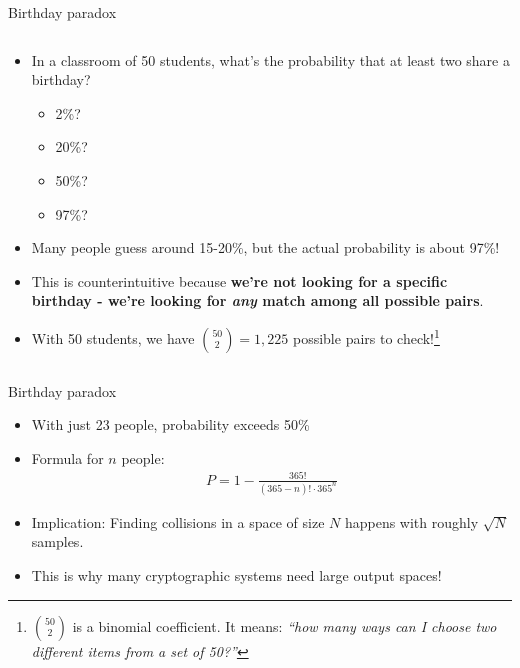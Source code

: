 \documentclass[aspectratio=169, lualatex, handout]{beamer}
\begin{document}
\begin{frame}{Birthday paradox}
	\begin{columns}[c]
		\begin{column}{1\textwidth}
			\begin{itemize}[<+->]
				\item In a classroom of 50 students, what's the probability that at least two share a birthday?
				      \begin{itemize}
					      \item 2\%?
					      \item 20\%?
					      \item 50\%?
					      \item 97\%?
				      \end{itemize}
				\item Many people guess around 15-20\%, but the actual probability is about 97\%!
				\item This is counterintuitive because \textbf{we're not looking for a specific birthday - we're looking for \textit{any} match among all possible pairs}.
				\item With 50 students, we have $\binom{50}{2} = 1,225$ possible pairs to check!\footnote{$\binom{50}{2}$ is a binomial coefficient. It means: \textit{``how many ways can I choose two different items from a set of 50?''}}
			\end{itemize}
		\end{column}
	\end{columns}
\end{frame}

\begin{frame}{Birthday paradox}
	\begin{itemize}[<+->]
		\item With just 23 people, probability exceeds 50\%
		\item Formula for $n$ people:
		      \begin{align*}
			      P = 1 - \frac{365!}{(365-n)! \cdot 365^n}
		      \end{align*}
		\item Implication: Finding collisions in a space of size $N$ happens with roughly $\sqrt{N}$ samples.
		\item This is why many cryptographic systems need large output spaces!
	\end{itemize}
\end{frame}
\end{document}
